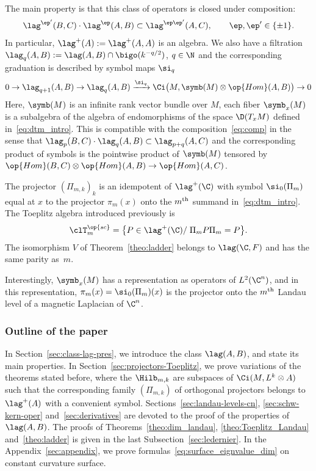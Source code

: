 The main property is that this class of operators is closed under composition:
\begin{gather}\label{eq:comp}
\lag^{\ep'} (B, C) \cdot \lag^{\ep} (A,B) \subset \lag^{\ep \ep'} (A,C),
\qquad \ep, \ep' \in \{ \pm 1\}.
\end{gather}
In particular, $\lag^+ (A) := \lag^{+} (A,A)$ is an algebra. We also have a filtration $ \lag_q(A,B) := \lag (A,B) \cap
\bigo (k^{-q/2})$, $q \in \N$ and the corresponding graduation is described by symbol maps $\si_q$
\[
0 \rightarrow \lag_{q+1} (A,B) \rightarrow \lag_q (A,B) \xrightarrow{\si_q} \Ci \big(M
, \symb (M) \otimes \op{Hom} (A,B)\big) \rightarrow 0
\]
Here, $\symb (M)$ is an infinite rank vector bundle over $M$, each fiber $\symb_x(M)$ is a subalgebra of the algebra of endomorphisms of the space $\D (T_xM)$ defined in~\eqref{eq:dtm_intro}. This is compatible with the composition~\eqref{eq:comp} in the sense that $\lag_p (B,C) \cdot \lag_q (A,B) \subset \lag_{p+q} (A,C)$ and the corresponding product of symbols is the pointwise product of $\symb(M)$ tensored by $\op{Hom} (B,C) \otimes \op{Hom} (A,B) \rightarrow \op{Hom} (A,C)$.


The projector $(\Pi_{m,k})_k$ is an idempotent of $\lag^+ (\C)$ with symbol $\si_0 (\Pi_{m})$ equal at $x$ to the projector $\pi_m (x)$ onto the $m^{\rm th}$ summand in~\eqref{eq:dtm_intro}. The Toeplitz algebra introduced previously is
\begin{gather}\label{eq:toep_land}
\clT_m^{\op{sc}} = \big\{ P
\in \lag^{+} (\C) / \; \Pi_m P \Pi_m = P \big\}.
\end{gather}
The isomorphism $V$ of Theorem~\ref{theo:ladder} belongs to $\lag (\C, F)$ and has the same parity as~$m$.

Interestingly, $\symb_x(M)$ has a representation as operators of $L^2 (\C^n)$, and in this representation, $ \pi_m(x) = \si_0 (\Pi_m)(x)$ is the projector onto the $m^{\rm th}$ Landau level of a magnetic Laplacian of $\C^n$.


\break
\subsubsection{Outline of the paper}
In Section~\ref{sec:class-lag-pres}, we introduce the class $\lag (A,B)$, and state its main properties. In Section~\ref{sec:projectors-Toeplitz}, we prove variations of the theorems stated before, where the $\Hilb_{m,k}$ are subspaces of $\Ci (M, L^k \otimes A)$ such that the corresponding family $(\Pi_{m,k})$ of orthogonal projectors belongs to $\lag^+ (A)$ with a convenient symbol. Sections~\ref{sec:landau-levels-cn}, \ref{sec:schw-kern-oper} and~\ref{sec:derivatives} are devoted to the proof of the properties of $\lag (A,B)$. The proofs of Theorems~\ref{theo:dim_landau}, \ref{theo:Toeplitz_Landau} and~\ref{theo:ladder} is given in the last Subsection~\ref{sec:ledernier}. In the Appendix~\ref{sec:appendix}, we prove formulas~\eqref{eq:surface_eignvalue_dim} on constant curvature surface.



